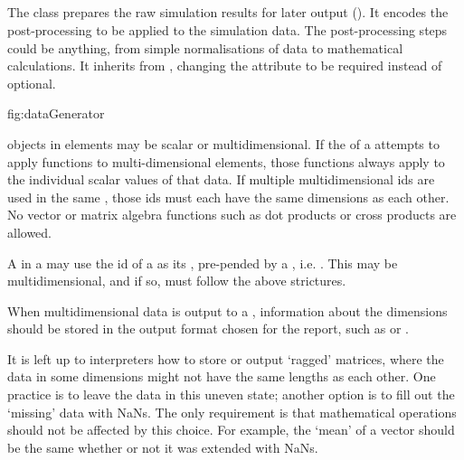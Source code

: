 \subsection{}
\label{class:dataGenerator}

The  class prepares the raw simulation results for later output (). It encodes the post-processing  to be applied to the simulation data. The post-processing steps could be anything, from simple normalisations of data to mathematical calculations.  It inherits from \Calculation, changing the  attribute to be required instead of optional.

 {fig:dataGenerator}

\Variable objects in \DataGenerator elements may be scalar or multidimensional.  If the \Math of a \DataGenerator attempts to apply functions to multi-dimensional elements, those functions always apply to the individual scalar values of that data.  If multiple multidimensional \Variable ids are used in the same \Math, those ids must each have the same dimensions as each other.  No vector or matrix algebra functions such as dot products or cross products are allowed.

A \Variable in a \DataGenerator may use the id of a \DataSource as its , pre-pended by a , i.e. .  This \Variable may be multidimensional, and if so, must follow the above strictures.

When multidimensional data is output to a \Report, information about the dimensions should be stored in the output format chosen for the report, such as \CSV or \HDF.

It is left up to interpreters how to store or output `ragged' matrices, where the data in some dimensions might not have the same lengths as each other.  One practice is to leave the data in this uneven state; another option is to fill out the `missing' data with NaNs.  The only requirement is that mathematical operations should not be affected by this choice.  For example, the `mean' of a vector should be the same whether or not it was extended with NaNs.

